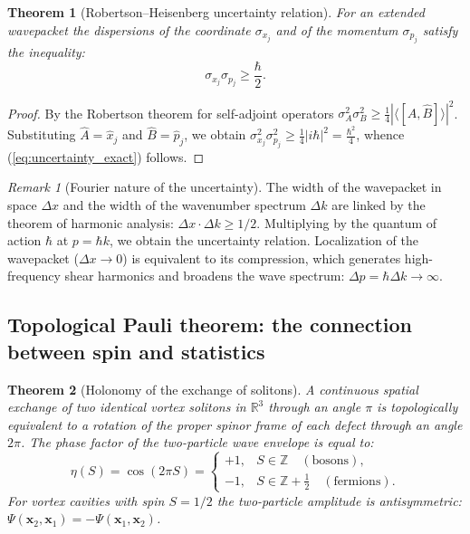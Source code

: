 \documentclass[11pt,a4paper]{article}
\newtheorem{theorem}{Theorem}
\theoremstyle{definition}
\theoremstyle{remark}
\newtheorem{remark}{Remark}
\begin{document}
\begin{theorem}[Robertson--Heisenberg uncertainty relation]
\label{thm:heisenberg_robertson_exact}
	For an extended wavepacket the dispersions of the coordinate $\sigma_{x_j}$ and of the momentum $\sigma_{p_j}$ satisfy the inequality:
\begin{equation}
	\sigma_{x_j} \sigma_{p_j} \ge \frac{\hbar}{2}.
	\label{eq:uncertainty_exact}
\end{equation}
\end{theorem}
\begin{proof}
	By the Robertson theorem for self-adjoint operators $\sigma_A^2 \sigma_B^2 \ge \frac{1}{4} | \langle [\hat{A}, \hat{B}] \rangle |^2$. Substituting $\hat{A} = \hat{x}_j$ and $\hat{B} = \hat{p}_j$, we obtain $\sigma_{x_j}^2 \sigma_{p_j}^2 \ge \frac{1}{4} | i\hbar |^2 = \frac{\hbar^2}{4}$, whence (\ref{eq:uncertainty_exact}) follows.
\end{proof}

\begin{remark}[Fourier nature of the uncertainty]
	The width of the wavepacket in space $\Delta x$ and the width of the wavenumber spectrum $\Delta k$ are linked by the theorem of harmonic analysis: $\Delta x \cdot \Delta k \ge 1/2$. Multiplying by the quantum of action $\hbar$ at $p = \hbar k$, we obtain the uncertainty relation. Localization of the wavepacket ($\Delta x \to 0$) is equivalent to its compression, which generates high-frequency shear harmonics and broadens the wave spectrum: $\Delta p = \hbar \Delta k \to \infty$.
\end{remark}

\subsection{Topological Pauli theorem: the connection between spin and statistics}

\begin{theorem}[Holonomy of the exchange of solitons]
\label{thm:pauli_holonomy_exact}
	A continuous spatial exchange of two identical vortex solitons in $\mathbb{R}^3$ through an angle $\pi$ is topologically equivalent to a rotation of the proper spinor frame of each defect through an angle $2\pi$. The phase factor of the two-particle wave envelope is equal to:
\begin{equation}
	\eta(S) = \cos(2\pi S) = \begin{cases} +1, & S \in \mathbb{Z} \quad (\text{bosons}), \\ -1, & S \in \mathbb{Z} + \frac{1}{2} \quad (\text{fermions}). \end{cases}
\label{eq:spin_stat_factor}
\end{equation}
	For vortex cavities with spin $S = 1/2$ the two-particle amplitude is antisymmetric: $\Psi(\mathbf{x}_2, \mathbf{x}_1) = -\Psi(\mathbf{x}_1, \mathbf{x}_2)$.
\end{theorem}
\end{document}

